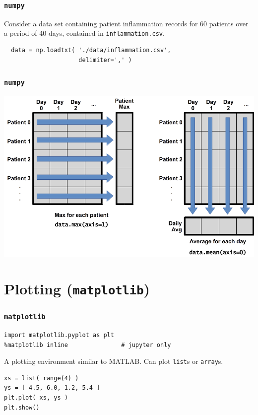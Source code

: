 \documentclass[11pt]{beamer}
\begin{document}
\begin{frame}[fragile]
  \frametitle{\texttt{numpy}}
  \Enlarge

  Consider a data set containing patient inflammation records for 60 patients over a period of 40 days, contained in \texttt{inflammation.csv}.

  \begin{Verbatim}
  data = np.loadtxt( './data/inflammation.csv',
                     delimiter=',' )
  \end{Verbatim}
\end{frame}

\begin{frame}[fragile]
  \frametitle{\texttt{numpy}}
  \Enlarge

  \includegraphics[width=\textwidth]{./img/axes.png}
\end{frame}

\section{Plotting (\texttt{matplotlib})}

\begin{frame}[fragile]
  \frametitle{\texttt{matplotlib}}
  \Enlarge

  \begin{Verbatim}
import matplotlib.pyplot as plt
%matplotlib inline               # jupyter only
  \end{Verbatim}
  \begin{enumerate}
  \myitem  A plotting environment similar to MATLAB.
  \myitem  Can plot \texttt{list}s or \texttt{array}s.
  \end{enumerate}
  \begin{Verbatim}
xs = list( range(4) )
ys = [ 4.5, 6.0, 1.2, 5.4 ]
plt.plot( xs, ys )
plt.show()
  \end{Verbatim}
\end{frame}
\end{document}
